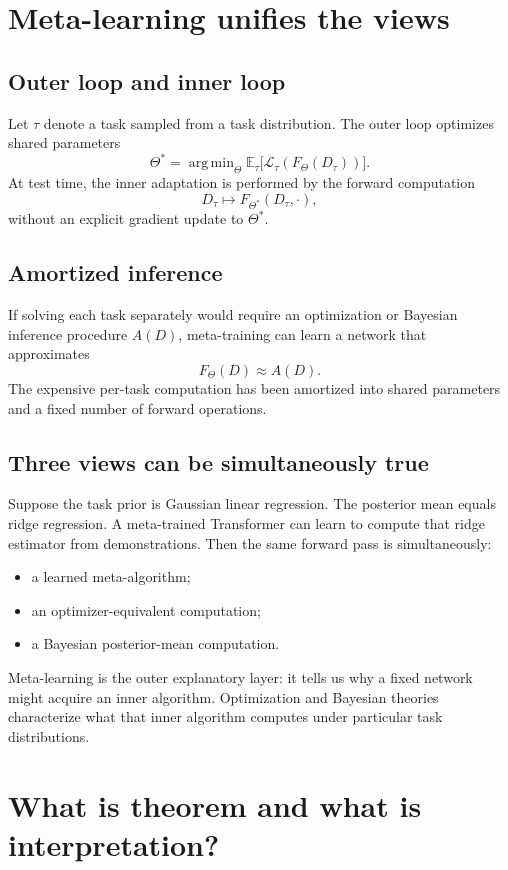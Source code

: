 \documentclass[11pt,a4paper,oneside,openany]{memoir}
\newcommand{\E}{\mathbb{E}}
\DeclareMathOperator*{\argmin}{arg\,min}
\theoremstyle{definition}
\begin{document}
\chapter{Meta-learning unifies the views}
\section{Outer loop and inner loop}
Let $\tau$ denote a task sampled from a task distribution.  The outer loop optimizes shared parameters
\[
\Theta^*=\argmin_\Theta\E_{\tau}\bigl[\mathcal L_\tau(F_\Theta(D_\tau))\bigr].
\]
At test time, the inner adaptation is performed by the forward computation
\[
D_\tau\mapsto F_{\Theta^*}(D_\tau,\cdot),
\]
without an explicit gradient update to $\Theta^*$.

\section{Amortized inference}
If solving each task separately would require an optimization or Bayesian inference procedure $A(D)$, meta-training can learn a network that approximates
\[
F_\Theta(D)\approx A(D).
\]
The expensive per-task computation has been amortized into shared parameters and a fixed number of forward operations.

\section{Three views can be simultaneously true}
Suppose the task prior is Gaussian linear regression.  The posterior mean equals ridge regression.  A meta-trained Transformer can learn to compute that ridge estimator from demonstrations.  Then the same forward pass is simultaneously:
\begin{itemize}
\item a learned meta-algorithm;
\item an optimizer-equivalent computation;
\item a Bayesian posterior-mean computation.
\end{itemize}

\begin{presentbox}
Meta-learning is the outer explanatory layer: it tells us why a fixed network might acquire an inner algorithm.  Optimization and Bayesian theories characterize what that inner algorithm computes under particular task distributions.
\end{presentbox}

\chapter{What is theorem and what is interpretation?}
\end{document}
